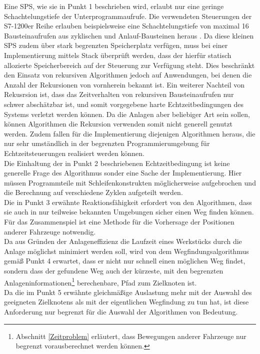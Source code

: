 		Eine \ac{SPS}, wie sie in Punkt 1 beschrieben wird, erlaubt nur eine geringe Schachtelungstiefe der Unterprogrammaufrufe. Die verwendeten Steuerungen der S7-1200er Reihe erlauben beispielsweise eine Schachtelungstiefe von maximal 16 Bausteinaufrufen aus zyklischen und Anlauf-Bausteinen heraus \cite{S7-1200}.  Da diese kleinen \ac{SPS} zudem über stark begrenzten Speicherplatz verfügen, muss bei einer Implementierung  mittels Stack überprüft werden, dass der hierfür statisch allozierte Speicherbereich auf der Steuerung zur Verfügung steht. Dies beschränkt den Einsatz von rekursiven Algorithmen jedoch auf Anwendungen, bei denen die Anzahl der Rekursionen von vornherein bekannt ist. Ein weiterer Nachteil von Rekusrsion ist, dass das Zeitverhalten von rekursiven Bausteinaufrufen nur schwer abschätzbar ist, und somit vorgegebene harte Echtzeitbedingungen des Systems verletzt werden können. Da die Anlagen aber beliebiger Art sein sollen, können Algorithmen die Rekursion verwenden somit nicht generell genutzt werden. Zudem fallen für die Implementierung diejenigen Algorithmen heraus, die nur sehr umständlich in der begrenzten Programmierumgebung für Echtzeitsteuerungen realisiert werden können.
		\\[4pt]
		Die Einhaltung der in Punkt 2 beschriebenen Echtzeitbedingung ist keine generelle Frage des Algorithmus sonder eine Sache der Implementierung. Hier müssen Programmteile mit Schleifenkonstrukten möglicherweise aufgebrochen und die Berechnung auf verschiedene Zyklen aufgeteilt werden.
		\\[4pt]
		Die in Punkt 3 erwähnte Reaktionsfähigkeit erfordert von den Algorithmen, dass sie auch in nur teilweise bekannten Umgebungen sicher einen Weg finden können. Für das Zusammenspiel ist eine Methode für die Vorhersage der Positionen anderer Fahrzeuge notwendig.
		\\[4pt]
		Da aus Gründen der Anlageneffizienz die Laufzeit eines Werkstücks durch die Anlage möglichst minimiert werden soll, wird von dem Wegfindungsalgorithmus gemäß Punkt 4 erwartet, dass er nicht nur schnell einen möglichen Weg findet, sondern dass der gefundene Weg auch der kürzeste, mit den begrenzten Anlageninformationen\footnote{ Abschnitt \ref{Zeitproblem} erläutert, dass Bewegungen anderer Fahrzeuge nur begrenzt vorausberechnet werden können.} berechenbare, Pfad zum Zielknoten ist.
		\\[4pt]
		Da die im Punkt 5 erwähnte gleichmäßige Auslastung mehr mit der Auswahl des geeigneten Zielknotens als mit der eigentlichen Wegfindung zu tun hat, ist diese Anforderung nur begrenzt für die Auswahl der Algorithmen von Bedeutung.
		

